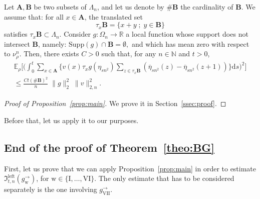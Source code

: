 \documentclass[AHL,Unicode,longabstracts]{cedram}
\newcommand{\bfA}{\mathbf{A}}
\newcommand{\bfB}{\mathbf{B}}
\newcommand*{\rmw}{\mathrm{w}}
\newcommand*{\rmleft}{\mathrm{left}}
\newcommand*{\rmI}{\mathrm{I}}
\newcommand*{\rmVI}{\mathrm{VI}}
\newcommand*{\rmVII}{\mathrm{VII}}
\newcommand{\bb}[1]{{\mathbb #1}}
\newcommand{\mf}[1]{{\mathfrak #1}}
\renewcommand{\bar}{\overline}
\renewcommand{\leq}{\leqslant}
\newcommand*{\dd}{\mathrm{d}}
\newcommand*{\ds}{\dd s}
\begin{document}
\begin{prop}\label{prop:main}
Let $\bfA, \bfB$ be two subsets of $\Lambda_n$, and let us denote by $\#{\bfB}$ the cardinality of $\bfB$. We assume that: for all $x\in\bfA$, the translated set
\[
\tau_x{\bfB}=\{x+y\; ; \; y \in \bfB\}
\]
satisfies $ \tau_x{\bfB}\subset \Lambda_n$. Consider $g:\Omega_n\to\bb R$ a local function whose support does not intersect $\bfB$, namely: $\mathrm{Supp}(g) \cap \mathbf{B} = \emptyset,$ and which has mean zero with respect to $\nu^n_\rho$. Then, there exists $C>0$ such that, for any $n \in \bb N$ and $t>0$,
\begin{multline}\label{eq:main-estim}
\bb E_\rho\bigg[\bigg(\int_0^t\sum_{x\in\bfA} \Big\{v(x) \tau_xg(\eta_{sn^2}) \sum_{z\in\tau_x\bfB} (\bar\eta_{sn^2}(z)-\bar\eta_{sn^2}(z+1)) \Big\} \ds \bigg)^2\bigg] \\ \leq \frac{Ct(\#{\bfB})^2}{n}\; \|g\|_2^2 \; \|v\|_{2,n}^2.
\end{multline}
\end{prop}

\begin{proof}[Proof of Proposition~\ref{prop:main}] We prove it in Section~\ref{ssec:proof}.
\end{proof}

Before that, let us apply it to our purposes.

\subsection{End of the proof of Theorem~\ref{theo:BG}} First, let us prove that we can apply Proposition~\ref{prop:main} in order to estimate $\mf I_{t,n}^{\rmleft}(g^\rightarrow_{\rmw})$, for ${\rmw} \in \{ \rmI,\dots, \rmVI\}$. The only estimate that has to be considered separately is the one involving $g^\rightarrow_{\rmVII}$.
\end{document}
